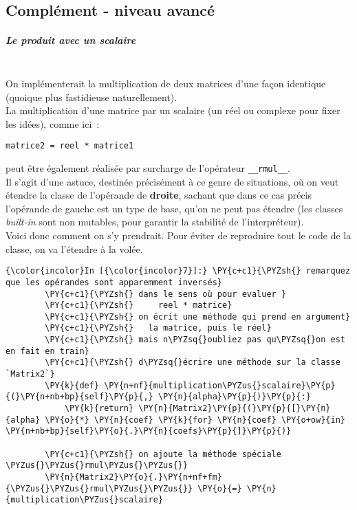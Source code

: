     \hypertarget{compluxe9ment---niveau-avancuxe9}{%
\subsection{Complément - niveau
avancé}\label{compluxe9ment---niveau-avancuxe9}}

    \hypertarget{le-produit-avec-un-scalaire}{%
\subparagraph{Le produit avec un
scalaire\\\\}\label{le-produit-avec-un-scalaire}}

    On implémenterait la multiplication de deux matrices d'une façon
identique (quoique plus fastidieuse naturellement).\\

La multiplication d'une matrice par un scalaire (un réel ou complexe
pour fixer les idées), comme ici~:

\begin{verbatim}
matrice2 = reel * matrice1
\end{verbatim}

peut être également réalisée par surcharge de l'opérateur
\texttt{\_\_rmul\_\_}.\\

Il s'agit d'une astuce, destinée précisément à ce genre de situations,
où on veut étendre la classe de l'opérande de \textbf{droite}, sachant
que dans ce cas précis l'opérande de gauche est un type de base, qu'on
ne peut pas étendre (les classes \emph{built-in} sont non mutables, pour
garantir la stabilité de l'interpréteur).\\

Voici donc comment on s'y prendrait. Pour éviter de reproduire tout le
code de la classe, on va l'étendre à la volée.

    \begin{Verbatim}[commandchars=\\\{\}]
{\color{incolor}In [{\color{incolor}7}]:} \PY{c+c1}{\PYZsh{} remarquez que les opérandes sont apparemment inversés}
        \PY{c+c1}{\PYZsh{} dans le sens où pour evaluer }
        \PY{c+c1}{\PYZsh{}     reel * matrice}
        \PY{c+c1}{\PYZsh{} on écrit une méthode qui prend en argument}
        \PY{c+c1}{\PYZsh{}   la matrice, puis le réel}
        \PY{c+c1}{\PYZsh{} mais n\PYZsq{}oubliez pas qu\PYZsq{}on est en fait en train}
        \PY{c+c1}{\PYZsh{} d\PYZsq{}écrire une méthode sur la classe `Matrix2`}
        \PY{k}{def} \PY{n+nf}{multiplication\PYZus{}scalaire}\PY{p}{(}\PY{n+nb+bp}{self}\PY{p}{,} \PY{n}{alpha}\PY{p}{)}\PY{p}{:}
            \PY{k}{return} \PY{n}{Matrix2}\PY{p}{(}\PY{p}{[}\PY{n}{alpha} \PY{o}{*} \PY{n}{coef} \PY{k}{for} \PY{n}{coef} \PY{o+ow}{in} \PY{n+nb+bp}{self}\PY{o}{.}\PY{n}{coefs}\PY{p}{]}\PY{p}{)}
        
        \PY{c+c1}{\PYZsh{} on ajoute la méthode spéciale \PYZus{}\PYZus{}rmul\PYZus{}\PYZus{}}
        \PY{n}{Matrix2}\PY{o}{.}\PY{n+nf+fm}{\PYZus{}\PYZus{}rmul\PYZus{}\PYZus{}} \PY{o}{=} \PY{n}{multiplication\PYZus{}scalaire}
\end{Verbatim}


